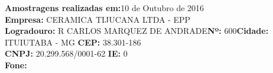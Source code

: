 \textbf{Amostragens realizadas em:}10 de Outubro de 2016 \\
\textbf{Empresa:} CERAMICA TIJUCANA LTDA - EPP \\
\textbf{Logradouro:} R CARLOS MARQUEZ DE ANDRADE\textbf{Nº:} 600\textbf{Cidade:} ITUIUTABA - MG \textbf{CEP:} 38.301-186\\
\textbf{CNPJ:} 20.299.568/0001-62 \textbf{IE:} 0 \\
\textbf{Fone:}  \\